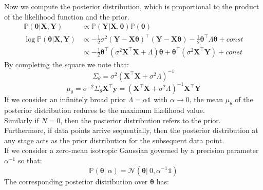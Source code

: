 \documentclass[twoside]{article}
\begin{document}
Now we compute the posterior distribution, which is proportional to the product of the likelihood function and the prior.
\begin{equation*}
\begin{aligned}
    \mathbb{P}(\boldsymbol{\theta}| \boldsymbol{X}, \boldsymbol{Y}) &\propto \mathbb{P}(\boldsymbol{Y}|\boldsymbol{X},\boldsymbol{\theta}) \mathbb{P}(\boldsymbol{\theta})\\
    \log\mathbb{P}(\boldsymbol{\theta}| \boldsymbol{X}, \boldsymbol{Y}) &\propto -\frac{1}{2}\sigma^2(\boldsymbol{Y} - \boldsymbol{X}\boldsymbol{\theta})^\intercal(\boldsymbol{Y} - \boldsymbol{X}\boldsymbol{\theta}) - \frac{1}{2}\boldsymbol{\theta}^\intercal\Lambda\boldsymbol{\theta} + const\\
    &\propto -\frac{1}{2}\boldsymbol{\theta}^\intercal(\sigma^2\boldsymbol{X}^\intercal\boldsymbol{X} + \Lambda)\boldsymbol{\theta} + \boldsymbol{\theta}^\intercal(\sigma^2\boldsymbol{X}^\intercal\boldsymbol{Y}) + const
\end{aligned}
\end{equation*}
By completing the square we note that:
\begin{equation*}
    \Sigma_{\theta} = \sigma^{2}(\boldsymbol{X}^{\intercal}\boldsymbol{X} + \sigma^{2}\Lambda)^{-1}
\end{equation*}
\begin{equation*}
    \mu_{\theta} = \sigma^{-2}\Sigma_{\theta}\boldsymbol{X}^{\intercal}\boldsymbol{y} = (\boldsymbol{X}^{\intercal}\boldsymbol{X} + \sigma^{2}\Lambda)^{-1}\boldsymbol{X}^{\intercal}\boldsymbol{Y}
\end{equation*}
If we consider an infinitely broad prior $\Lambda = \alpha\mathds{1}$ with $\alpha \to 0$, the mean $\mu_\theta$ of the posterior distribution reduces to the maximum likelihood value.\\
Similarly if $N = 0$, then the posterior distribution refers to the prior.\\
Furthermore, if data points arrive sequentially, then the posterior distribution at any stage acts as the prior distribution for the subsequent data point.\\
If we consider a zero-mean isotropic Gaussian governed by a precision parameter $\alpha^{-1}$ so that:
\begin{equation*}
    \mathbb{P}(\boldsymbol{\theta}|\:\alpha) = \mathcal{N}(\boldsymbol{\theta}|\:0,\alpha^{-1}\mathds{1})
\end{equation*}
The corresponding posterior distribution over $\boldsymbol{\theta}$ has:
\end{document}
